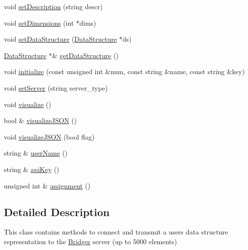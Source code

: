 \begin{DoxyCompactItemize}
\item 
void \mbox{\hyperlink{namespacebridges_1_1_bridges_ada1bced1a3d7af3b8b139bbdfba72fc8}{set\+Description}} (string descr)
\item 
void \mbox{\hyperlink{namespacebridges_1_1_bridges_a0c04930dee803801d3a26c6ef70183f2}{set\+Dimensions}} (int $\ast$dims)
\item 
void \mbox{\hyperlink{namespacebridges_1_1_bridges_a7447e2d5808c492d26132690c1a639a7}{set\+Data\+Structure}} (\mbox{\hyperlink{classbridges_1_1_data_structure}{Data\+Structure}} $\ast$ds)
\item 
\mbox{\hyperlink{classbridges_1_1_data_structure}{Data\+Structure}} $\ast$\& \mbox{\hyperlink{namespacebridges_1_1_bridges_a7cee9c57a0cd6a213722ba0a81a742f0}{get\+Data\+Structure}} ()
\item 
void \mbox{\hyperlink{namespacebridges_1_1_bridges_a10272250ed6f4bb8281dcaecc61fa698}{initialize}} (const unsigned int \&num, const string \&name, const string \&key)
\item 
void \mbox{\hyperlink{namespacebridges_1_1_bridges_a569953bfdb1c2a29dbd0f7d6dee73606}{set\+Server}} (string server\+\_\+type)
\item 
void \mbox{\hyperlink{namespacebridges_1_1_bridges_a2806e395134614cdd6327400b53d28ad}{visualize}} ()
\item 
bool \& \mbox{\hyperlink{namespacebridges_1_1_bridges_a692124feb006d58c277db36c2e9342c8}{visualize\+J\+S\+ON}} ()
\item 
void \mbox{\hyperlink{namespacebridges_1_1_bridges_abb0f749a6dbcd0a430504f66de1dbe64}{visualize\+J\+S\+ON}} (bool flag)
\item 
string \& \mbox{\hyperlink{namespacebridges_1_1_bridges_a98c0c6658b8eb9e8f20a7f3119cbd984}{user\+Name}} ()
\item 
string \& \mbox{\hyperlink{namespacebridges_1_1_bridges_a4ec319d8c731624bd1aa0efa2427044e}{api\+Key}} ()
\item 
unsigned int \& \mbox{\hyperlink{namespacebridges_1_1_bridges_a97d6cfdc40ecead5d802ac2054933038}{assignment}} ()
\end{DoxyCompactItemize}


\subsection{Detailed Description}
This class contains methods to connect and transmit a user\textquotesingle{}s data structure representation to the \mbox{\hyperlink{namespacebridges_1_1_bridges}{Bridges}} server (up to 5000 elements) 


